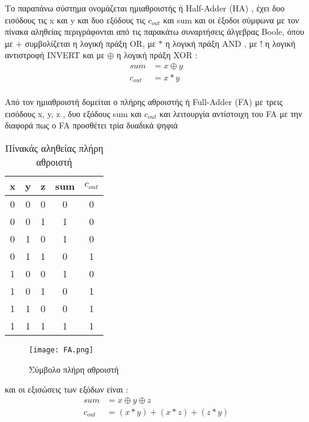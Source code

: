 Το παραπάνω σύστημα ονομάζεται ημιαθροιστής ή Half-Adder (HA) , έχει δυο εισόδους τις x και y και δυο εξόδους τις $c_{out}$ και sum και οι έξοδοι σύμφωνα με τον πίνακα αληθείας περιγράφονται από τις παρακάτω συναρτήσεις άλγεβρας Boole, όπου με $+$ συμβολίζεται η λογική πράξη ΟR, με $*$ η λογική πράξη ΑΝD , με $!$ η λογική αντιστροφή INVERT και με $\oplus$ η λογική πράξη XOR :\\
\begin{equation}
\begin{split}
    sum &= x \oplus y \\ 
    c_{out} &= x * y
\end{split}
\end{equation}\\



Από τον ημιαθροιστή δομείται ο πλήρης αθροιστής ή Full-Adder (FA) με τρεις εισόδους x, y, z , δυο εξόδους sum και $c_{out}$ και λειτουργία αντίστοιχη του FA με την διαφορά πως ο FA προσθέτει τρία δυαδικά ψηφιά \\
\begin{multicols}{2}
\hfill
\begin{table}[H]
\centering
 \begin{tabular}{||c c c | c c||} 
 \hline
 x & y & z & sum & $c_{out}$ \\ [0.5ex] 
 \hline\hline
 0 & 0 & 0 & 0 & 0 \\ 
 \hline
 0 & 0 & 1 & 1 & 0 \\
 \hline
 0 & 1 & 0 & 1 & 0 \\
 \hline
 0 & 1 & 1 & 0 & 1 \\
 \hline
 1 & 0 & 0 & 1 & 0 \\ 
 \hline
 1 & 0 & 1 & 0 & 1 \\
 \hline
 1 & 1 & 0 & 0 & 1 \\
 \hline
 1 & 1 & 1 & 1 & 1 \\
 \hline
\end{tabular}
\caption{Πίνακάς αληθείας πλήρη αθροιστή}
\label{table:2}
\end{table}
\begin{figure}[H]
\centering
\texttt{[image: FA.png]}
\caption{Σύμβολο πλήρη αθροιστή}
\label{FASchematic}
\end{figure}
\end{multicols}
και οι εξισώσεις των εξόδων είναι :
\begin{equation}
\begin{split}
    sum &= x \oplus y \oplus z \\
    c_{out} &= ( x * y ) + ( x * z ) + ( z * y )
\end{split}
\end{equation}





